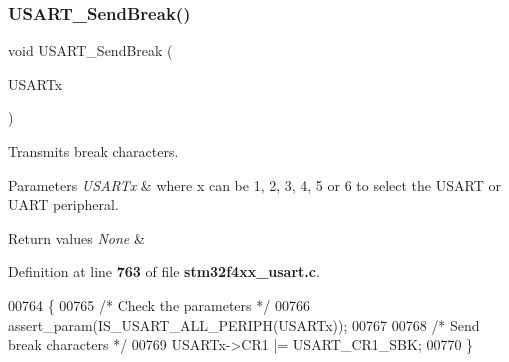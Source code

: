\subsubsection{U\+S\+A\+R\+T\+\_\+\+Send\+Break()}
{\footnotesize\ttfamily void U\+S\+A\+R\+T\+\_\+\+Send\+Break (\begin{DoxyParamCaption}\item[{\textbf{ U\+S\+A\+R\+T\+\_\+\+Type\+Def} $\ast$}]{U\+S\+A\+R\+Tx }\end{DoxyParamCaption})}



Transmits break characters. 


\begin{DoxyParams}{Parameters}
{\em U\+S\+A\+R\+Tx} & where x can be 1, 2, 3, 4, 5 or 6 to select the U\+S\+A\+RT or U\+A\+RT peripheral. \\
\hline
\end{DoxyParams}

\begin{DoxyRetVals}{Return values}
{\em None} & \\
\hline
\end{DoxyRetVals}


Definition at line \textbf{ 763} of file \textbf{ stm32f4xx\+\_\+usart.\+c}.


\begin{DoxyCode}
00764 \{
00765   \textcolor{comment}{/* Check the parameters */}
00766   assert_param(IS_USART_ALL_PERIPH(USARTx));
00767   
00768   \textcolor{comment}{/* Send break characters */}
00769   USARTx->CR1 |= USART_CR1_SBK;
00770 \}
\end{DoxyCode}
